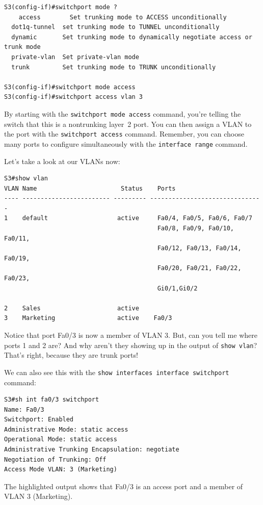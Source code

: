 \begin{verbatim}
S3(config-if)#switchport mode ?
    access        Set trunking mode to ACCESS unconditionally
  dot1q-tunnel  set trunking mode to TUNNEL unconditionally
  dynamic       Set trunking mode to dynamically negotiate access or trunk mode
  private-vlan  Set private-vlan mode
  trunk         Set trunking mode to TRUNK unconditionally
 
S3(config-if)#switchport mode access
S3(config-if)#switchport access vlan 3
\end{verbatim}

By starting with the \texttt{switchport\ mode\ access} command, you're
telling the switch that this is a nontrunking layer~2 port. You can then
assign a VLAN to the port with the \texttt{switchport\ access} command.
Remember, you can choose many ports to configure simultaneously with the
\texttt{interface\ range} command.

Let's take a look at our VLANs now:

\begin{verbatim}
S3#show vlan
VLAN Name                       Status    Ports
---- ------------------------ --------- -------------------------------
1    default                   active     Fa0/4, Fa0/5, Fa0/6, Fa0/7
                                          Fa0/8, Fa0/9, Fa0/10, Fa0/11,
                                          Fa0/12, Fa0/13, Fa0/14, Fa0/19,
                                          Fa0/20, Fa0/21, Fa0/22, Fa0/23,
                                          Gi0/1,Gi0/2
 
2    Sales                     active
3    Marketing                 active    Fa0/3
\end{verbatim}

Notice that port Fa0/3 is now a member of VLAN 3. But, can you tell me where ports 1 and
2 are? And why aren't they showing up in the output of
\texttt{show\ vlan}? That's right, because they are trunk ports!

We can also see this with the
\texttt{show\ interfaces\ interface\ switchport} command:

\begin{verbatim}
S3#sh int fa0/3 switchport
Name: Fa0/3
Switchport: Enabled
Administrative Mode: static access
Operational Mode: static access
Administrative Trunking Encapsulation: negotiate
Negotiation of Trunking: Off
Access Mode VLAN: 3 (Marketing)
\end{verbatim}

The highlighted output shows that Fa0/3 is an access port and a member
of VLAN 3 (Marketing).

